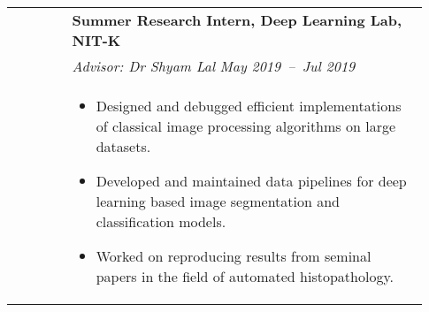 \documentclass[letterpaper, 10pt, oneside]{article}
\newcommand{\bdit}[1]{{\textbf{#1}}}
\begin{document}
\begin{longtable}{@{} p{0.13\linewidth} p{0.8\linewidth}}
                         & \bdit{Summer Research Intern, Deep Learning Lab, NIT-K}                                                                                                                                                           \\
                         & \textsl{Advisor: Dr Shyam Lal} \hfill \hspace{-3em} \textsl{May 2019\ --\ Jul 2019}                                                                                                                               \\
                         & \parbox{0.8\textwidth}{                                                                                                                                                                                           %
        \begin{itemize}[leftmargin=*, itemsep=-0.88ex, topsep=-0.88ex]
            \item Designed and debugged efficient implementations of classical image processing algorithms on large datasets.
            \item Developed and maintained data pipelines for deep learning based image segmentation and classification models.
            \item Worked on reproducing results from seminal papers in the field of automated histopathology.
        \end{itemize}
    }
    \\
    \\


\end{longtable}
\end{document}
